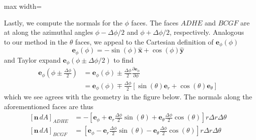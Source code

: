 \documentclass[a4paper]{article}
\begin{document}
\begin{center}
\begin{adjustbox}{max width=\linewidth}
\end{adjustbox}
\end{center}

Lastly, we compute the normals for the \( \phi \) faces. The faces \( ADHE \) and \( BCGF \) are at along the azimuthal angles \( \phi - \Delta \phi / 2 \) and \( \phi + \Delta \phi / 2 \), respectively. Analogous to our method in the \( \theta \) faces, we appeal to the Cartesian definition of \( \pmb{e}_{\phi}\!\left( \phi \right) \)
\[
	\pmb{e}_{\phi}\!\left( \phi \right) = -\sin\!\left(\phi\right)\pmb{\hat{x}} + \cos\!\left(\phi\right)\pmb{\hat{y}} 
\]
and Taylor expand \( \pmb{e}_{\phi}\!\left( \phi \pm \Delta \phi / 2 \right) \) to find
\begin{align*}
	\pmb{e}_{\phi}\!\left( \phi \pm \frac{\Delta \phi}{2} \right) & = \pmb{e}_{\phi}\!\left( \phi \right) \pm \frac{\Delta \phi}{2}\frac{\partial \pmb{e}_{\phi}}{\partial \phi} \\
								      & = \pmb{e}_{\phi}\!\left( \phi \right) \mp \frac{\Delta \phi}{2}\!\left[ \sin\!\left(\theta\right)\pmb{e}_{r} + \cos\!\left(\theta\right)\pmb{e}_{\theta} \right]
\end{align*}
which we see agrees with the geometry in the figure below. The normals along the aforementioned faces are thus
\begin{align*}
	\!\left[ \pmb{n} \, dA \right]_{ADHE} & = \boxed{-\!\left[ \pmb{e}_{\phi} + \pmb{e}_{r}\frac{\Delta \phi}{2}\sin\!\left(\theta\right) + \pmb{e}_{\theta}\frac{\Delta \phi}{2}\cos\!\left(\theta\right) \right]r \Delta r \Delta \theta} \\
	\!\left[ \pmb{n} \, dA \right]_{BCGF} & = \boxed{\!\left[ \pmb{e}_{\phi} - \pmb{e}_{r}\frac{\Delta \phi}{2}\sin\!\left(\theta\right) - \pmb{e}_{\theta}\frac{\Delta \phi}{2}\cos\!\left(\theta\right) \right]r \Delta r \Delta \theta}
\end{align*}
\end{document}
